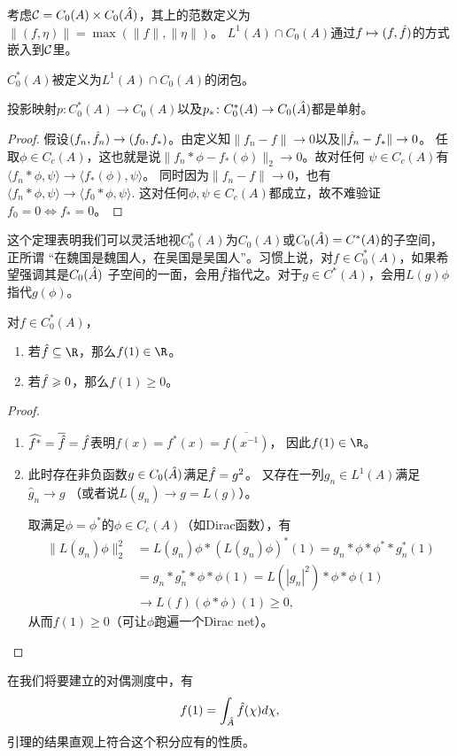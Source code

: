 考虑$\mathcal{C} = C_0(A) \times C_0(\hat{A})$，其上的范数定义为$\|(f,\eta)\| = \max(\|f\|,\|\eta\|)$。
$L^1(A) \cap C_0(A)$通过$f \mapsto (f,\hat{f})$的方式嵌入到$\mathcal{C}$里。
\begin{definition}
    $C_0^*(A)$被定义为$L^1(A) \cap C_0(A)$的闭包。
\end{definition}
\begin{proposition}
    投影映射$p \colon C_0^*(A) \to C_0(A)$以及$p_* \colon C_0^*(A) \to C_0(\hat{A})$都是单射。
\end{proposition}
\begin{proof}
    假设$(f_n,\hat{f}_n) \to (f_0,f_*)$。由定义知$\|f_n-f\| \to 0$以及$\|\hat{f}_n - f_*\| \to 0$。
    任取$\phi \in C_c(A)$，这也就是说$\|f_n*\phi - f_*(\phi)\|_2 \to 0$。故对任何
    $\psi \in C_c(A)$有$\langle f_n*\phi,\psi \rangle \to \langle f_*(\phi),\psi \rangle$。
    同时因为$\|f_n - f\| \to 0$，也有$\langle f_n*\phi,\psi \rangle \to \langle f_0*\phi,\psi \rangle$.
    这对任何$\phi,\psi \in C_c(A)$都成立，故不难验证$f_0 = 0 \iff f_* = 0$。
\end{proof}
这个定理表明我们可以灵活地视$C_0^*(A)$为$C_0(A)$或$C_0(\hat{A}) = C^*(A)$的子空间，正所谓
“在魏国是魏国人，在吴国是吴国人”。习惯上说，对$f \in C_0^*(A)$，如果希望强调其是$C_0(\hat{A})$
子空间的一面，会用$\hat{f}$指代之。对于$g \in C^*(A)$，会用$L(g)\phi$指代$g(\phi)$。
\begin{lemma}\label{yl87}
    对$f \in C_0^*(A)$，
    \begin{enumerate}
        \item 若$\f \subseteq \R$，那么$f(1) \in \R$。
        \item 若$\hat{f} \geqslant 0$，那么$f(1) \geqslant 0$。
    \end{enumerate}
\end{lemma}
\begin{proof}
    \begin{enumerate}
        \item $\widehat{f^*} = \overline{\hat{f}} = \hat{f}$表明$f(x) = f^*(x) = \overline{f(x^{-1})}$，
        因此$f(1)\in \R$。
        \item 此时存在非负函数$g \in C_0(\hat{A})$满足$\hat{f} = g^2$。
        又存在一列$g_n \in L^1(A)$满足$\hat{g}_n \to g$
        （或者说$L(g_n) \to g = L(g)$）。

        取满足$\phi = \phi^*$的$\phi \in C_c(A)$（如Dirac函数），有\begin{align*}
            \|L(g_n)\phi\|_2^2 & = L(g_n)\phi * (L(g_n)\phi)^* (1) = g_n*\phi*\phi^* * g_n^*(1) \\ 
            & = g_n*g_n^* *\phi * \phi(1) = L(|g_n|^2) *\phi*\phi(1) \\ & \to L(f)(\phi*\phi)(1) \geqslant 0,
        \end{align*}
        从而$f(1) \geqslant 0$（可让$\phi$跑遍一个Dirac net）。\qedhere
    \end{enumerate}
\end{proof}
在我们将要建立的对偶测度中，有\[f(1) = \int_{\hat{A}} \hat{f}(\chi) d\chi,\]引理的结果直观上符合这个积分应有的性质。

